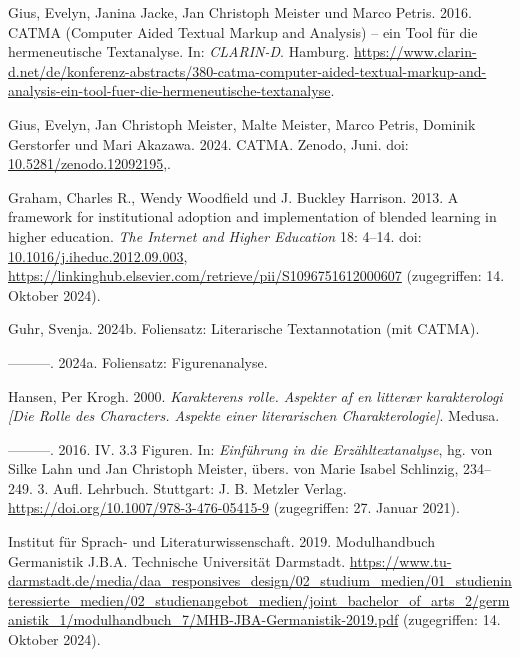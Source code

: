 \documentclass[
          a4paper,
        ]{article}
\newlength{\cslhangindent}
\newenvironment{CSLReferences}[2] %
 {\begin{list}{}{%
  \setlength{\itemindent}{0pt}
  \setlength{\leftmargin}{0pt}
  \setlength{\parsep}{0pt}
  \ifodd #1
   \setlength{\leftmargin}{\cslhangindent}
   \setlength{\itemindent}{-1\cslhangindent}
  \fi
  \setlength{\itemsep}{#2\baselineskip}}}
 {\end{list}}
\begin{document}
\begin{CSLReferences}{1}{0}
Gius, Evelyn, Janina Jacke, Jan Christoph Meister und Marco Petris.
2016. {CATMA} ({Computer} {Aided} {Textual} {Markup} and {Analysis}) --
ein {Tool} für die hermeneutische {Textanalyse}. In:
\emph{{CLARIN}-{D}}. Hamburg.
\url{https://www.clarin-d.net/de/konferenz-abstracts/380-catma-computer-aided-textual-markup-and-analysis-ein-tool-fuer-die-hermeneutische-textanalyse}.

Gius, Evelyn, Jan Christoph Meister, Malte Meister, Marco Petris,
Dominik Gerstorfer und Mari Akazawa. 2024. {CATMA}. Zenodo, Juni. doi:
\href{https://doi.org/10.5281/zenodo.12092195}{10.5281/zenodo.12092195},.

Graham, Charles R., Wendy Woodfield und J. Buckley Harrison. 2013. A
framework for institutional adoption and implementation of blended
learning in higher education. \emph{The Internet and Higher Education}
18: 4--14. doi:
\href{https://doi.org/10.1016/j.iheduc.2012.09.003}{10.1016/j.iheduc.2012.09.003},
\url{https://linkinghub.elsevier.com/retrieve/pii/S1096751612000607}
(zugegriffen: 14. Oktober 2024).

Guhr, Svenja. 2024b. Foliensatz: Literarische Textannotation (mit
CATMA).

---------. 2024a. Foliensatz: Figurenanalyse.

Hansen, Per Krogh. 2000. \emph{Karakterens rolle. Aspekter af en
litterær karakterologi {[}Die Rolle des Characters. Aspekte einer
literarischen Charakterologie{]}}. Medusa.

---------. 2016. {IV}. 3.3 {Figuren}. In: \emph{Einführung in die
{Erzähltextanalyse}}, hg. von Silke Lahn und Jan Christoph Meister,
übers. von Marie Isabel Schlinzig, 234--249. 3. Aufl. Lehrbuch.
Stuttgart: J. B. Metzler Verlag.
\url{https://doi.org/10.1007/978-3-476-05415-9} (zugegriffen: 27. Januar
2021).

Institut für Sprach- und Literaturwissenschaft. 2019. Modulhandbuch
{Germanistik} {J}.{B}.{A}. Technische Universität Darmstadt.
\url{https://www.tu-darmstadt.de/media/daa_responsives_design/02_studium_medien/01_studieninteressierte_medien/02_studienangebot_medien/joint_bachelor_of_arts_2/germanistik_1/modulhandbuch_7/MHB-JBA-Germanistik-2019.pdf}
(zugegriffen: 14. Oktober 2024).


\end{CSLReferences}
\end{document}
